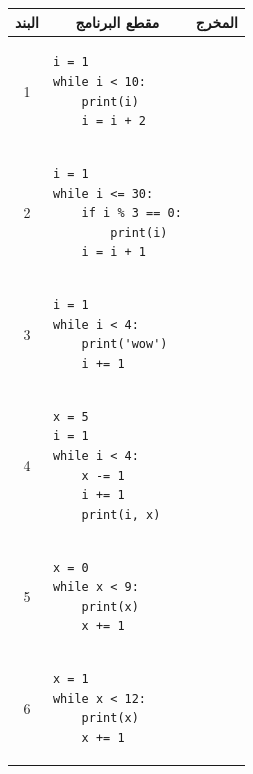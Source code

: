 \documentclass[14pt]{extarticle}
\begin{document}
{\small
\renewcommand{\arraystretch}{1.3}
\begin{longtable}{|c|p{}|p{}|}
\hline
\multicolumn{1}{|c|}{\textbf{البند}} & \multicolumn{1}{c|}{\textbf{مقطع البرنامج}} & \multicolumn{1}{c|}{\textbf{المخرج}} \\
\hline
\endhead
1 &
\begin{pycell}
\begin{english}
\begin{verbatim}
i = 1
while i < 10:
    print(i)
    i = i + 2
\end{verbatim}
\end{english}
\end{pycell} & \rule{0pt}{1.7cm} \\
\hline
2 &
\begin{pycell}
\begin{english}
\begin{verbatim}
i = 1
while i <= 30:
    if i % 3 == 0:
        print(i)
    i = i + 1
\end{verbatim}
\end{english}
\end{pycell} & \rule{0pt}{1.7cm} \\
\hline
3 &
\begin{pycell}
\begin{english}
\begin{verbatim}
i = 1
while i < 4:
    print('wow')
    i += 1
\end{verbatim}
\end{english}
\end{pycell} & \rule{0pt}{1.7cm} \\
\hline
4 &
\begin{pycell}
\begin{english}
\begin{verbatim}
x = 5
i = 1
while i < 4:
    x -= 1
    i += 1
    print(i, x)
\end{verbatim}
\end{english}
\end{pycell} & \rule{0pt}{1.7cm} \\
\hline
5 &
\begin{pycell}
\begin{english}
\begin{verbatim}
x = 0
while x < 9:
    print(x)
    x += 1
\end{verbatim}
\end{english}
\end{pycell} & \rule{0pt}{1.7cm} \\
\hline
6 &
\begin{pycell}
\begin{english}
\begin{verbatim}
x = 1
while x < 12:
    print(x)
    x += 1
\end{verbatim}
\end{english}
\end{pycell} & \rule{0pt}{1.7cm} \\
\hline
\end{longtable}
}
\end{document}
